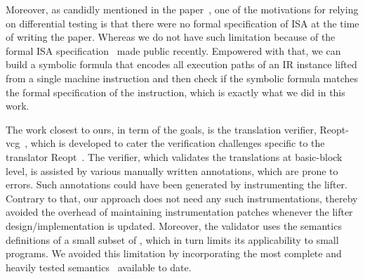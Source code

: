 
Moreover, as candidly mentioned in the paper~\cite{ASE2017}, one of the 
motivations for
relying on differential testing  is that there were no
formal specification of \ISA ISA at the time of
writing the paper. Whereas we do not have such limitation because of the formal
\ISA ISA specification~\cite{DasguptaAdve:PLDI19} made public recently.
Empowered with that, we can build a symbolic formula that encodes all execution
paths of an IR instance lifted from a single machine instruction and then
check if the symbolic formula matches the formal specification of the
instruction, which is exactly what we did in this work.

The work closest to ours, in term of the goals, is the translation verifier,
Reopt-vcg~\cite{Galois:SPISA19}, which is developed to cater the verification
challenges specific to the translator Reopt~\cite{reopt}. The verifier, which
validates the translations at basic-block level, is assisted by various
manually written annotations, which are prone to errors. Such annotations
could have been generated by instrumenting the lifter. 
%
 Contrary to that, our approach  does not need any such 
instrumentations, thereby avoided
the overhead of maintaining instrumentation patches whenever the lifter
design/implementation is updated. 
Moreover, 
the validator uses the semantics
definitions of a small subset of \ISA, which in turn limits its 
applicability
to small programs. We avoided this
limitation by incorporating the most complete and heavily tested \ISA
semantics~\cite{DasguptaAdve:PLDI19} available to date.

%
%
%
%
        
